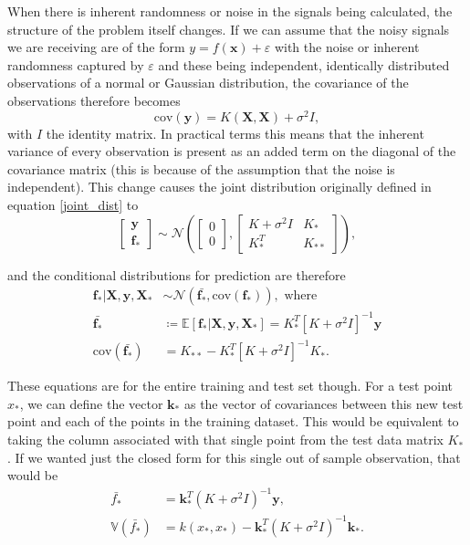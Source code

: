 When there is inherent randomness or noise in the signals being calculated, the structure of the problem itself changes. If we can assume that the noisy signals we are receiving are of the form $y = f(\boldsymbol{x}) + \varepsilon$ with the noise or inherent randomness captured by $\varepsilon$ and these being independent, identically distributed observations of a normal or Gaussian distribution, the covariance of the observations therefore becomes 
\[ \text{cov}(\boldsymbol{y}) = K(\boldsymbol{X}, \boldsymbol{X}) + \sigma^2 I, \]
with $I$ the identity matrix. In practical terms this means that the inherent variance of every observation is present as an added term on the diagonal of the covariance matrix (this is because of the assumption that the noise is independent). This change causes the joint distribution originally defined in equation \ref{joint_dist} to
\[ 
\begin{bmatrix}
	\boldsymbol{y} \\
	\boldsymbol{f}_*
\end{bmatrix} \sim \mathcal{N}\left( \begin{bmatrix}
	0 \\
	0
\end{bmatrix} , \begin{bmatrix}
	K + \sigma^2 I & K_* \\
	K_*^T & K_{**}
\end{bmatrix} \right), 
\]

and the conditional distributions for prediction are therefore 
\begin{align*}
	\boldsymbol{f}_* | \boldsymbol{X}, \boldsymbol{y}, \boldsymbol{X}_* &\sim \mathcal{N}(\bar{\boldsymbol{f}_*}, \text{cov}(\boldsymbol{f}_*)), \text{ where} \\
	\bar{\boldsymbol{f}_*} &\coloneqq \mathbb{E}[\boldsymbol{f}_* | \boldsymbol{X}, \boldsymbol{y}, \boldsymbol{X}_*] = K_*^T [K + \sigma^2 I]^{-1} \boldsymbol{y} \\
	\text{cov}(\bar{\boldsymbol{f}_*}) &= K_{**} -  K_*^T [K + \sigma^2 I]^{-1} K_*.
\end{align*}

These equations are for the entire training and test set though. For a test point $x_*$, we can define the vector $\boldsymbol{k}_*$ as the vector of covariances between this new test point and each of the points in the training dataset. This would be equivalent to taking the column associated with that single point from the test data matrix $K_*$. If we wanted just the closed form for this single out of sample observation, that would be 
\begin{align*}
	\bar{f_*} &= \boldsymbol{k}_*^T(K + \sigma^2 I)^{-1} \boldsymbol{y}, \\
	\mathbb{V}(\bar{f_*}) &= k(x_*, x_*) - \boldsymbol{k}_*^T (K + \sigma^2 I)^{-1} \boldsymbol{k}_*.
\end{align*}



